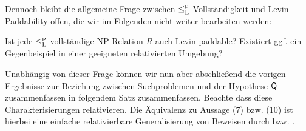 Dennoch bleibt die allgemeine Frage zwischen $\leq_\mathrm{L}^\mathrm{p}$-Vollständigkeit und Levin-Paddability offen, die wir im Folgenden nicht weiter bearbeiten werden:
\begin{question}
    Ist jede $\leq_\mathrm{L}^\mathrm{p}$-vollständige NP-Relation $R$ auch Levin-paddable?
    Existiert ggf. ein Gegenbeispiel in einer geeigneten relativierten Umgebung?
\end{question}


Unabhängig von dieser Frage können wir nun aber abschließend die vorigen Ergebnisse zur Beziehung zwischen Suchproblemen und der Hypothese $\mathsf{Q}$ zusammenfassen in folgendem Satz zusammenfassen.
Beachte dass diese Charakterisierungen relativieren.
Die Äquivalenz zu Aussage (7) bzw. (10) ist hierbei eine einfache relativierbare Generalisierung von Beweisen durch \textcite[Thm.~5.3]{messner_simulation_2001} bzw. \textcite{fenner_inverting_2003}.

